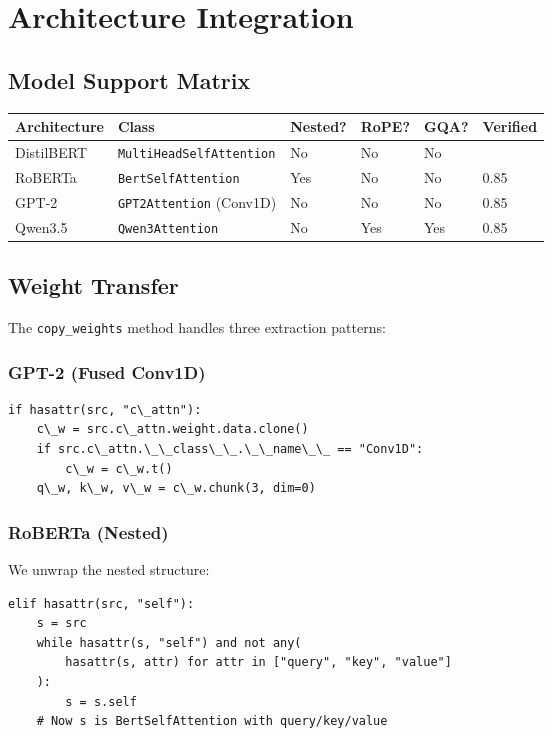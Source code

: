 
\section{Architecture Integration}

\subsection{Model Support Matrix}

\begin{table}[H]
\centering
\small
\begin{tabular}{llllll}
\toprule
\textbf{Architecture} & \textbf{Class} & \textbf{Nested?} & \textbf{RoPE?} & \textbf{GQA?} & \textbf{Verified} \\
\midrule
DistilBERT & \texttt{MultiHeadSelfAttention} & No & No & No &  \\
RoBERTa & \texttt{BertSelfAttention} & Yes & No & No & 0.85 \\
GPT-2 & \texttt{GPT2Attention} (Conv1D) & No & No & No & 0.85 \\
Qwen3.5 & \texttt{Qwen3Attention} & No & Yes & Yes & 0.85 \\
\bottomrule
\end{tabular}
\end{table}

\subsection{Weight Transfer}

The \texttt{copy\_weights} method handles three extraction patterns:

\subsubsection{GPT-2 (Fused Conv1D)}

\begin{lstlisting}
if hasattr(src, "c\_attn"):
    c\_w = src.c\_attn.weight.data.clone()
    if src.c\_attn.\_\_class\_\_.\_\_name\_\_ == "Conv1D":
        c\_w = c\_w.t()
    q\_w, k\_w, v\_w = c\_w.chunk(3, dim=0)
\end{lstlisting}

\subsubsection{RoBERTa (Nested)}

We unwrap the nested structure:

\begin{lstlisting}
elif hasattr(src, "self"):
    s = src
    while hasattr(s, "self") and not any(
        hasattr(s, attr) for attr in ["query", "key", "value"]
    ):
        s = s.self
    # Now s is BertSelfAttention with query/key/value
\end{lstlisting}

